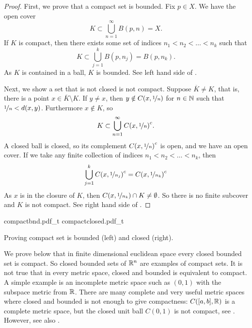 \begin{proof}
First, we prove that a compact set is bounded.
Fix $p \in X$.  We have the open cover
\begin{equation*}
K \subset \bigcup_{n=1}^\infty B(p,n) = X .
\end{equation*}
If $K$ is compact, then there exists some set of indices
$n_1 < n_2 < \ldots < n_k$ such that
\begin{equation*}
K \subset \bigcup_{j=1}^k B(p,n_j) = B(p,n_k) .
\end{equation*}
As $K$ is contained in a ball, $K$ is bounded.
See left hand side of .

Next, we show a set that is not closed is not compact.  Suppose 
$\overline{K} \not= K$, that is, there is a point $x \in \overline{K}
\setminus K$.
If $y \not= x$, then
$y \notin C(x,\nicefrac{1}{n})$
for $n \in {\mathbb{N}}$
such that $\nicefrac{1}{n} < d(x,y)$.
Furthermore $x \notin K$, so
\begin{equation*}
K \subset \bigcup_{n=1}^\infty {C(x,\nicefrac{1}{n})}^c .
\end{equation*}
A closed ball is closed, so its complement ${C(x,\nicefrac{1}{n})}^c$ is open, and
we have an open cover.
If we take any
finite collection of indices $n_1 < n_2 < \ldots < n_k$, then 
\begin{equation*}
\bigcup_{j=1}^k {C(x,\nicefrac{1}{n_j})}^c 
=
{C(x,\nicefrac{1}{n_k})}^c 
\end{equation*}
As $x$ is in the closure of $K$,
then
$C(x,\nicefrac{1}{n_k}) \cap K \not= \emptyset$.  So there is no
finite subcover and $K$ is not compact.
See right hand side of .
\end{proof}

\begin{myfigureht}
{compactbnd.pdf_t}
\qquad \qquad
{compactclosed.pdf_t}
\caption{Proving compact set is bounded (left) and closed (right).\label{fig:compactbndclosed}}
\end{myfigureht}

We prove below that 
in finite dimensional euclidean space
every closed bounded set is compact.
So closed bounded sets
of ${\mathbb{R}}^n$ are examples of compact sets.
It is not true that in every metric space, closed and bounded is equivalent
to compact.  A simple example is an incomplete metric space such as
$(0,1)$ with the subspace metric from ${\mathbb{R}}$.
There are many complete and very useful metric spaces
where closed and bounded is not
enough to give compactness: $C([a,b],{\mathbb{R}})$ is a complete metric
space, but the closed unit ball $C(0,1)$ is not compact, see
.  However, see also
.

